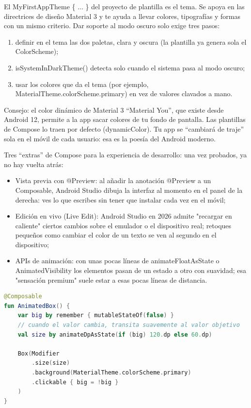 El MyFirstAppTheme \{ ... \} del proyecto de plantilla es el tema. Se apoya en las directrices de diseño Material 3 y te ayuda a llevar colores, tipografías y formas con un mismo criterio. Dar soporte al modo oscuro solo exige tres pasos:

\begin{enumerate}
  \item definir en el tema las dos paletas, clara y oscura (la plantilla ya genera sola el ColorScheme);
  \item isSystemInDarkTheme() detecta solo cuando el sistema pasa al modo oscuro;
  \item usar los colores que da el tema (por ejemplo, MaterialTheme.colorScheme.primary) en vez de valores clavados a mano.
\end{enumerate}

\begin{tcbinfo}{Consejo: el color dinámico de Material 3}
“Material You”, que existe desde Android 12, permite a la app sacar colores de tu fondo de pantalla. Las plantillas de Compose lo traen por defecto (dynamicColor). Tu app se “cambiará de traje” sola en el móvil de cada usuario: esa es la poesía del Android moderno.

\end{tcbinfo}


Tres “extras” de Compose para la experiencia de desarrollo: una vez probados, ya no hay vuelta atrás:

\begin{itemize}
  \item Vista previa con @Preview: al añadir la anotación @Preview a un Composable, Android Studio dibuja la interfaz al momento en el panel de la derecha: ves lo que escribes sin tener que instalar cada vez en el móvil;
  \item Edición en vivo (Live Edit): Android Studio en 2026 admite "recargar en caliente" ciertos cambios sobre el emulador o el dispositivo real; retoques pequeños como cambiar el color de un texto se ven al segundo en el dispositivo;
  \item APIs de animación: con unas pocas líneas de animateFloatAsState o AnimatedVisibility los elementos pasan de un estado a otro con suavidad; esa "sensación premium" suele estar a esas pocas líneas de distancia.
\end{itemize}

\begin{lstlisting}[language=Kotlin]
@Composable
fun AnimatedBox() {
    var big by remember { mutableStateOf(false) }
    // cuando el valor cambia, transita suavemente al valor objetivo
    val size by animateDpAsState(if (big) 120.dp else 60.dp)

    Box(Modifier
        .size(size)
        .background(MaterialTheme.colorScheme.primary)
        .clickable { big = !big }
    )
}
\end{lstlisting}

